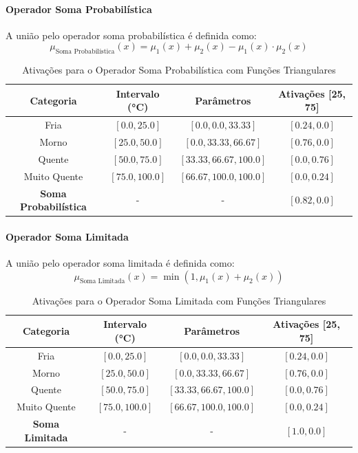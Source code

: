 \documentclass[a4paper,12pt]{article}
\begin{document}
\paragraph{Operador Soma Probabilística}

A união pelo operador soma probabilística é definida como:
\[
\mu_{\text{Soma Probabilística}}(x) = \mu_1(x) + \mu_2(x) - \mu_1(x) \cdot \mu_2(x)
\]

\begin{table}[H]
\centering
\caption{Ativações para o Operador Soma Probabilística com Funções Triangulares}
\begin{tabular}{|c|c|c|c|}
\hline
\textbf{Categoria}    & \textbf{Intervalo (°C)} & \textbf{Parâmetros}       & \textbf{Ativações [25, 75]} \\ \hline
Fria                  & $[0.0, 25.0]$          & $[0.0, 0.0, 33.33]$       & $[0.24, 0.0]$              \\ \hline
Morno                 & $[25.0, 50.0]$         & $[0.0, 33.33, 66.67]$     & $[0.76, 0.0]$              \\ \hline
Quente                & $[50.0, 75.0]$         & $[33.33, 66.67, 100.0]$   & $[0.0, 0.76]$              \\ \hline
Muito Quente          & $[75.0, 100.0]$        & $[66.67, 100.0, 100.0]$   & $[0.0, 0.24]$              \\ \hline
\textbf{Soma Probabilística} & -       & -                         & $[0.82, 0.0]$             \\ \hline
\end{tabular}
\end{table}

\paragraph{Operador Soma Limitada}

A união pelo operador soma limitada é definida como:
\[
\mu_{\text{Soma Limitada}}(x) = \min(1, \mu_1(x) + \mu_2(x))
\]

\begin{table}[H]
\centering
\caption{Ativações para o Operador Soma Limitada com Funções Triangulares}
\begin{tabular}{|c|c|c|c|}
\hline
\textbf{Categoria}    & \textbf{Intervalo (°C)} & \textbf{Parâmetros}       & \textbf{Ativações [25, 75]} \\ \hline
Fria                  & $[0.0, 25.0]$          & $[0.0, 0.0, 33.33]$       & $[0.24, 0.0]$              \\ \hline
Morno                 & $[25.0, 50.0]$         & $[0.0, 33.33, 66.67]$     & $[0.76, 0.0]$              \\ \hline
Quente                & $[50.0, 75.0]$         & $[33.33, 66.67, 100.0]$   & $[0.0, 0.76]$              \\ \hline
Muito Quente          & $[75.0, 100.0]$        & $[66.67, 100.0, 100.0]$   & $[0.0, 0.24]$              \\ \hline
\textbf{Soma Limitada} & -            & -                         & $[1.0, 0.0]$             \\ \hline
\end{tabular}
\end{table}
\end{document}
